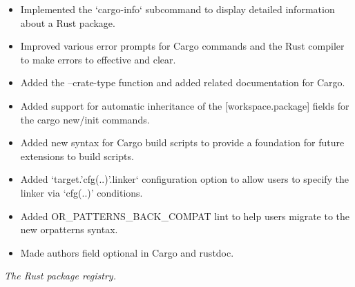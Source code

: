\documentclass{software_engineer_rustin_liu}
\newcommand{\en}[1]{#1}
\newcommand{\zh}[1]{}
\begin{document}
\begin{itemize}
      \item \en{Implemented the `cargo-info` subcommand to display detailed information about a Rust package.}
            \zh{为 Cargo 实现了 `cargo-info` 子命令来展示包的详细信息。}
      \item \en{Improved various error prompts for Cargo commands and the Rust compiler to make errors to effective and clear.}
            \zh{改善了大量 Cargo 命令和 Rust 编译器的错误提示，让错误更有效更清晰。}
      \item \en{Added the --crate-type function and added related documentation for Cargo.}
            \zh{为 Cargo 添加了 --crate-type 功能和相关文档。}
      \item \en{Added support for automatic inheritance of the [workspace.package] fields for the cargo new/init commands.}
            \zh{为 cargo new 和 cargo init 命令支持了 [workspace.package] 字段自动继承。}
      \item \en{Added new syntax for Cargo build scripts to provide a foundation for future extensions to build scripts.}
            \zh{为 Cargo 构建脚本添加新的语法，为未来扩展构建脚本提供基础。}
      \item \en{Added `target.'cfg(..)'.linker` configuration option to allow users to specify the linker via `cfg(..)' conditions.}
            \zh{添加了 `target.'cfg(..)'.linker` 配置项，允许用户通过 `cfg(..)' 条件来指定链接器。}
      \item \en{Added OR\_PATTERNS\_BACK\_COMPAT lint to help users migrate to the new or\-patterns syntax.}
            \zh{添加了 OR\_PATTERNS\_BACK\_COMPAT lint 来帮助用户迁移至新的 or\-patterns 语法。}
      \item \en{Made authors field optional in Cargo and rustdoc.}
            \zh{使 authors 字段在 Cargo 和 rustdoc 中可选。}
\end{itemize}


\en{}
\zh{\datedsubsection{\textbf{crates.io(Rust/JS) - 维护者}}{{\href{https://github.com/tokio-rs/console/commits?author=Rustin170506}{38+ commits}}}}
\en{\textsl{The Rust package registry.}}
\zh{\textsl{Rust 包管理中心。}}
\end{document}
